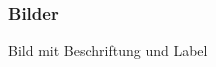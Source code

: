 \begin{frame}
    \frametitle{Bilder}
    \begin{block}{Bild mit Beschriftung und Label}
        
        \pause
        
    \end{block}
\end{frame}
